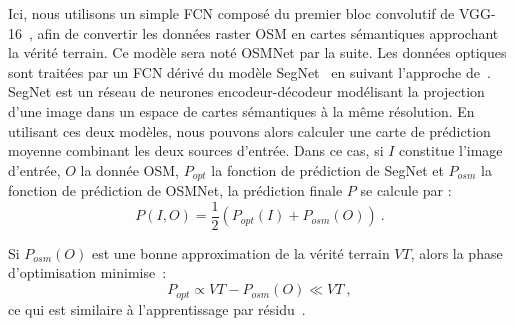Ici, nous utilisons un simple FCN composé du premier bloc convolutif de VGG-16~\cite{simonyan_very_2014}, afin de convertir les données raster OSM en cartes sémantiques approchant la vérité terrain. Ce modèle sera noté OSMNet par la suite. Les données optiques sont traitées par un FCN dérivé du modèle SegNet~\cite{badrinarayanan_segnet_2017} en suivant l'approche de~\cite{audebert_semantic_2016}. SegNet est un réseau de neurones encodeur-décodeur modélisant la projection d'une image dans un espace de cartes sémantiques à la même résolution. En utilisant ces deux modèles, nous pouvons alors calculer une carte de prédiction moyenne combinant les deux sources d'entrée. Dans ce cas, si $I$ constitue l'image d'entrée, $O$ la donnée OSM, $P_{opt}$ la fonction de prédiction de SegNet et $P_{osm}$ la fonction de prédiction de OSMNet, la prédiction finale $P$ se calcule par :
\begin{equation}
P(I, O) = \frac{1}{2} (P_{opt}(I) + P_{osm}(O))~.
\end{equation}

Si $P_{osm}(O)$ est une bonne approximation de la vérité terrain $VT$, alors la phase d'optimisation minimise~:
\begin{equation}
P_{opt} \propto VT - P_{osm}(O) \ll VT~,
\end{equation}
ce qui est similaire à l'apprentissage par résidu~\cite{he_deep_2016}.

